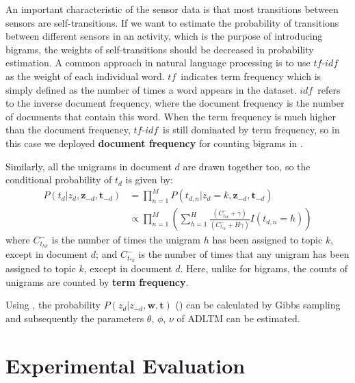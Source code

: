 \documentclass{article}
\newcommand{\z}{\mathbf{z}}
\newcommand{\w}{\mathbf{w}}
\newcommand{\tb}{\mathbf{t}}
\begin{document}
\newcommand{\tf}{\ensuremath{\mathit{tf}}}
\newcommand{\idf}{\ensuremath{\mathit{idf}}}
An important characteristic of the sensor data is that most transitions between sensors are self-transitions. If we want to estimate the probability of transitions between different sensors in an activity, which is the purpose of introducing bigrams, the weights of self-transitions should be decreased in probability estimation. A common approach in natural language processing is to use \tf-\idf\ \cite{salton1988term} as the weight of each individual word. \tf\ indicates term frequency which is simply defined as the number of times a word appears in the dataset. \idf\ refers to the inverse document frequency, where the document frequency is the number of documents that contain this word. When the term frequency is much higher than the document frequency, \tf-\idf\ is still dominated by term frequency, so in this case we deployed \textbf{document frequency} for counting bigrams in .

Similarly, all the unigrams in document $d$ are drawn together too, so the conditional probability of $t_d$ is given by:
%
\begin{equation} \label{eq:adl_tm1}
\begin{split}
P(t_d | z_d,\z_{-d}, \tb_{-d}) & = \prod_{n=1}^{M} P(t_{d,n}  | z_d = k, \z_{-d}, \tb_{-d}) \\
& \propto \prod_{n=1}^{M} \left( \sum_{h=1}^H \frac{(C_{t_{hk}}^{-}+\gamma)}{(C_{t_{*k}}^{-}+H\gamma)} I(t_{d,n} = h) \right)
\end{split}
\end{equation}
%
where $C_{t_{hk}}^{-}$ is the number of times the unigram $h$ has been assigned to topic $k$, except in document $d$; and 
$C_{t_{*k}}^{-}$ is the number of times that any unigram has been assigned to topic $k$, except in document $d$. Here, unlike for bigrams, the counts of unigrams are counted by \textbf{term frequency}.

Using , the probability $P(z_d | z_{-d}, \w, \tb)$ () can be calculated by Gibbs sampling and subsequently the parameters $\theta$, $\phi$, $\nu$ of \ac{ADLTM} can be estimated.

%
\section{Experimental Evaluation}
\label{sec:eva}
\end{document}
